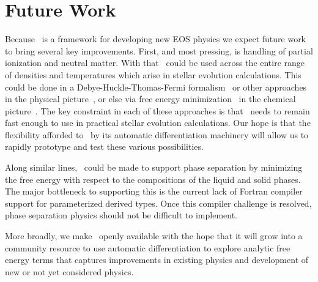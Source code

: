 \section{Future Work}\label{sec:conc}

Because \skye\ is a framework for developing new EOS physics we expect future work to bring several key improvements.
First, and most pressing, is handling of partial ionization and neutral matter.
With that \skye\ could be used across the entire range of densities and temperatures which arise in stellar evolution calculations.
This could be done in a Debye-Huckle-Thomas-Fermi formalism~\citep{PhysRev.111.1460} or other approaches in the physical picture~\citep{Rogers2002}, or else via free energy minimization~\citep{Irwin2004} in the chemical picture~\citep{Saumon1995}.
The key constraint in each of these approaches is that \skye\ needs to remain fast enough to use in practical stellar evolution calculations.
Our hope is that the flexibility afforded to \skye\ by its automatic differentiation machinery will allow us to rapidly prototype and test these various possibilities.

Along similar lines, \skye\ could be made to support phase separation by minimizing the free energy with respect to the compositions of the liquid and solid phases.
The major bottleneck to supporting this is the current lack of Fortran compiler support for parameterized derived types.
Once this compiler challenge is resolved, phase separation physics  should not be difficult to implement.

More broadly, we make \skye\ openly available with the hope that it will grow into a community resource
to use automatic differentiation to explore analytic free energy terms that captures improvements in
existing physics and development of new or not yet considered physics.
